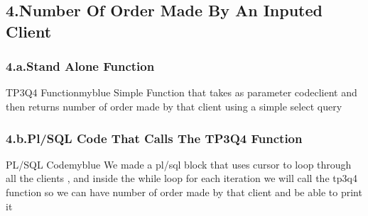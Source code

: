 \subsection*{4.Number Of Order Made By An Inputed Client}
\subsubsection*{4.a.Stand Alone Function}


\begin{prettyBox}{TP3Q4 Function}{myblue}
Simple Function that takes as parameter codeclient and then returns number of order made by that client using a simple select query
\end{prettyBox}

\newpage

\subsubsection*{4.b.Pl/SQL Code That Calls The TP3Q4 Function}


\begin{prettyBox}{PL/SQL Code}{myblue}
We made a pl/sql block that uses cursor to loop through all the clients , and inside the while loop
for each iteration we will call the tp3q4 function so we can have number of order made by that client and be able
to print it
\end{prettyBox}
